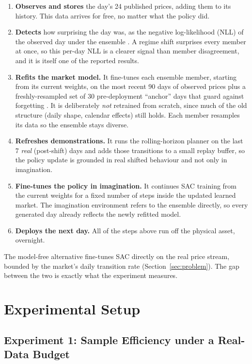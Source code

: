\documentclass[conference]{IEEEtran}
\begin{document}
\begin{enumerate}
\item \textbf{Observes and stores} the day's 24 published prices, adding them to its history. This data arrives for free, no matter what the policy did.
\item \textbf{Detects} how surprising the day was, as the negative log-likelihood (NLL) of the observed day under the ensemble \citep{gama2014conceptdrift}. A regime shift surprises every member at once, so this per-day NLL is a clearer signal than member disagreement, and it is itself one of the reported results.
\item \textbf{Refits the market model.} It fine-tunes each ensemble member, starting from its current weights, on the most recent 90 days of observed prices plus a freshly-resampled set of 30 pre-deployment ``anchor'' days that guard against forgetting \citep{khetarpal2022continualrl}. It is deliberately \emph{not} retrained from scratch, since much of the old structure (daily shape, calendar effects) still holds. Each member resamples its data so the ensemble stays diverse.
\item \textbf{Refreshes demonstrations.} It runs the rolling-horizon planner on the last 7 \emph{real} (post-shift) days and adds those transitions to a small replay buffer, so the policy update is grounded in real shifted behaviour and not only in imagination.
\item \textbf{Fine-tunes the policy in imagination.} It continues SAC training from the current weights for a fixed number of steps inside the updated learned market. The imagination environment refers to the ensemble directly, so every generated day already reflects the newly refitted model.
\item \textbf{Deploys the next day.} All of the steps above run off the physical asset, overnight.
\end{enumerate}

The model-free alternative fine-tunes SAC directly on the real price stream, bounded by the market's daily transition rate (Section~\ref{sec:problem}). The gap between the two is exactly what the experiment measures.

\section{Experimental Setup}
\label{sec:experimental-setup}

\subsection{Experiment 1: Sample Efficiency under a Real-Data Budget}
\label{sec:setup-budget}
\end{document}
